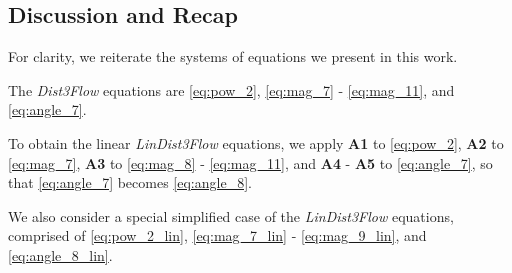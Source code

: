 
\subsection{Discussion and Recap}
\label{subsec:dist3flow_discussion}

For clarity, we reiterate the systems of equations we present in this work.

The \emph{Dist3Flow} equations are \eqref{eq:pow_2}, \eqref{eq:mag_7} - \eqref{eq:mag_11}, and \eqref{eq:angle_7}.

To obtain the linear \emph{LinDist3Flow} equations, we apply \textbf{A1} to \eqref{eq:pow_2}, \textbf{A2} to \eqref{eq:mag_7}, \textbf{A3} to \eqref{eq:mag_8} - \eqref{eq:mag_11}, and \textbf{A4} - \textbf{A5} to \eqref{eq:angle_7}, so that \eqref{eq:angle_7} becomes \eqref{eq:angle_8}.

We also consider a special simplified case of the \emph{LinDist3Flow} equations, comprised of \eqref{eq:pow_2_lin}, \eqref{eq:mag_7_lin} - \eqref{eq:mag_9_lin}, and  \eqref{eq:angle_8_lin}.